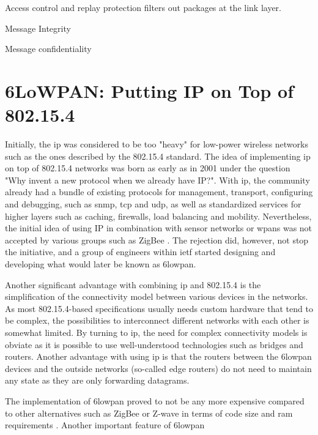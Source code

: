  

Access control and replay protection filters out packages at the link layer.

Message Integrity

Message confidentiality


\section{6LoWPAN: Putting IP on Top of 802.15.4}


Initially, the \gls{ip} was considered to be too "heavy" for low-power wireless networks such as the ones described by the 802.15.4 standard. The idea of implementing \gls{ip} on top of 802.15.4 networks was born as early as in 2001 under the question "Why invent a new protocol when we already have IP?"\cite{Mulligan2007}. With \gls{ip}, the community already had a bundle of existing protocols for management, transport, configuring and debugging, such as \gls{snmp}, \gls{tcp} and \gls{udp}, as well as standardized services for higher layers such as caching, firewalls, load balancing and mobility. Nevertheless, the initial idea of using IP in combination with sensor networks or \gls{wpan}s was not accepted by various groups such as ZigBee \cite{Mulligan2007}. The rejection did, however, not stop the initiative, and a group of engineers within \gls{ietf} started designing and developing what would later be known as \gls{6lowpan}.

Another significant advantage with combining \gls{ip} and 802.15.4 is the simplification of the connectivity model between various devices in the networks. As most 802.15.4-based specifications usually needs custom hardware that tend to be complex, the possibilities to interconnect different networks with each other is somewhat limited. By turning to \gls{ip}, the need for complex connectivity models is obviate as it is possible to use well-understood technologies such as bridges and routers. Another advantage with using \gls{ip} is that the routers between the \gls{6lowpan} devices and the outside networks (so-called edge routers) do not need to maintain any state as they are only forwarding datagrams.

The implementation of \gls{6lowpan} proved to not be any more expensive compared to other alternatives such as ZigBee or Z-wave in terms of code size and \gls{ram} requirements \cite{Mulligan2007}. Another important feature of \gls{6lowpan}

